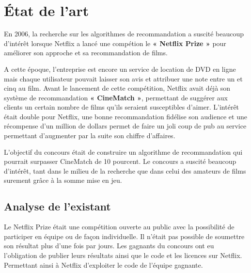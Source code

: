 \chapter{État de l’art}


En 2006, la recherche sur les algorithmes de recommandation a suscité beaucoup d’intérêt lorsque Netflix a lancé une compétion le \textbf{« Netflix Prize »} pour améliorer son approche et sa recommandation de films.

\vspace{5mm} 

 A cette époque, l’entreprise est encore un service de location de DVD en ligne mais chaque utilisateur pouvait laisser son avis et attribuer une note entre un et cinq au film. Avant le lancement de cette compétition, Netflix avait déjà son système de recommandation \textbf{« CineMatch »}, permettant de suggérer aux clients un certain nombre de films qu’ils seraient susceptibles d’aimer.
L’intérêt était double pour Netflix, une bonne recommandation fidélise son audience et une récompense d’un million de dollars permet de faire un joli coup de pub au service permettant d’augmenter par la suite son chiffre d’affaires. 

\vspace{5mm} 

L’objectif du concours était de construire un algorithme de recommandation qui pourrait surpasser CineMatch de 10 pourcent. Le concours a suscité beaucoup d’intérêt, tant dans le milieu de la recherche que dans celui des amateurs de films surement grâce à la somme mise en jeu. 

\vspace{5mm} 



\section{Analyse de l'existant }

Le Netflix Prize était une compétition ouverte au public avec la possibilité de participer en équipe ou de façon individuelle. Il n’était pas possible de soumettre son résultat plus d’une fois par jours. Les gagnants du concours ont eu l’obligation de publier leurs résultats ainsi que le code et les licences sur Netflix. Permettant ainsi à Netflix d'exploiter le code de l'équipe gagnante. 


\vspace{5mm} 

